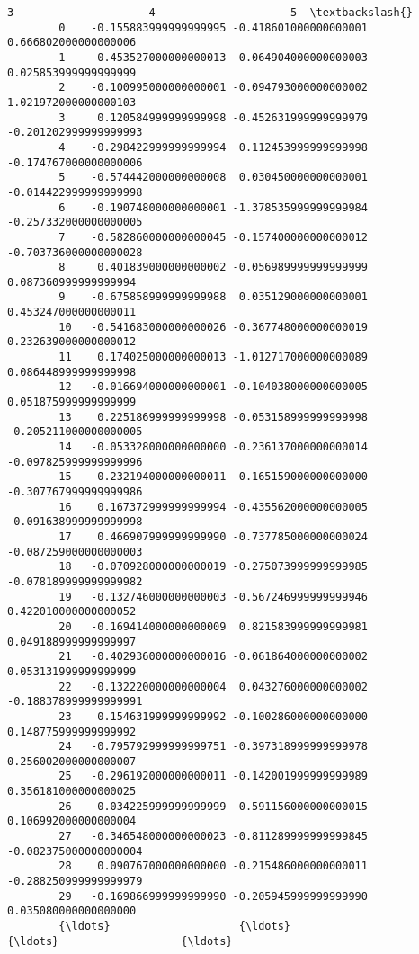 \documentclass[11pt]{article}
\begin{document}
\begin{Verbatim}[commandchars=\\\{\}]
                                 3                     4                     5  \textbackslash{}
        0    -0.155883999999999995 -0.418601000000000001  0.666802000000000006   
        1    -0.453527000000000013 -0.064904000000000003  0.025853999999999999   
        2    -0.100995000000000001 -0.094793000000000002  1.021972000000000103   
        3     0.120584999999999998 -0.452631999999999979 -0.201202999999999993   
        4    -0.298422999999999994  0.112453999999999998 -0.174767000000000006   
        5    -0.574442000000000008  0.030450000000000001 -0.014422999999999998   
        6    -0.190748000000000001 -1.378535999999999984 -0.257332000000000005   
        7    -0.582860000000000045 -0.157400000000000012 -0.703736000000000028   
        8     0.401839000000000002 -0.056989999999999999  0.087360999999999994   
        9    -0.675858999999999988  0.035129000000000001  0.453247000000000011   
        10   -0.541683000000000026 -0.367748000000000019  0.232639000000000012   
        11    0.174025000000000013 -1.012717000000000089  0.086448999999999998   
        12   -0.016694000000000001 -0.104038000000000005  0.051875999999999999   
        13    0.225186999999999998 -0.053158999999999998 -0.205211000000000005   
        14   -0.053328000000000000 -0.236137000000000014 -0.097825999999999996   
        15   -0.232194000000000011 -0.165159000000000000 -0.307767999999999986   
        16    0.167372999999999994 -0.435562000000000005 -0.091638999999999998   
        17    0.466907999999999990 -0.737785000000000024 -0.087259000000000003   
        18   -0.070928000000000019 -0.275073999999999985 -0.078189999999999982   
        19   -0.132746000000000003 -0.567246999999999946  0.422010000000000052   
        20   -0.169414000000000009  0.821583999999999981  0.049188999999999997   
        21   -0.402936000000000016 -0.061864000000000002  0.053131999999999999   
        22   -0.132220000000000004  0.043276000000000002 -0.188378999999999991   
        23    0.154631999999999992 -0.100286000000000000  0.148775999999999992   
        24   -0.795792999999999751 -0.397318999999999978  0.256002000000000007   
        25   -0.296192000000000011 -0.142001999999999989  0.356181000000000025   
        26    0.034225999999999999 -0.591156000000000015  0.106992000000000004   
        27   -0.346548000000000023 -0.811289999999999845 -0.082375000000000004   
        28    0.090767000000000000 -0.215486000000000011 -0.288250999999999979   
        29   -0.169866999999999990 -0.205945999999999990  0.035080000000000000   
        {\ldots}                    {\ldots}                   {\ldots}                   {\ldots}   

\end{Verbatim}
\end{document}
